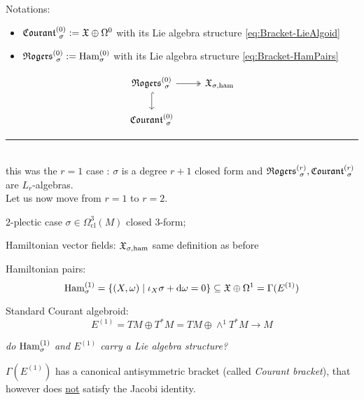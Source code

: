 \documentclass[beamer,10pt]{standalone}
\newcommand{\seprule}{\par\noindent\rule{.4\textwidth}{0.4pt}\\
}
\begin{document}
\begin{frame}
	\begin{block}{Notations:}
		\begin{itemize}
			\item $\Courant[\sigma]{0} := \X\oplus \Omega^{0}$ with its Lie algebra structure \eqref{eq:Bracket-LieAlgoid}
			\item $\Rogers[\sigma]{0} := \Ham^{(0)}_\sigma$ with its Lie algebra structure \eqref{eq:Bracket-HamPairs}
		\end{itemize}
	\end{block}
	\vfill

	\begin{displaymath}
		\begin{tikzcd}[ampersand replacement=\&]
			\Rogers[\sigma]{0}   \ar[r,two heads]\ar[d,hook]\& \X_{\sigma,\ham}
			\\ 
			\Courant[\sigma]{0}
		\end{tikzcd}
	\end{displaymath}
	\vfill

	\seprule
	this was the $r=1$ case : $\sigma$ is a degree $r+1$ closed form and $\Rogers[\sigma]{r},\Courant[\sigma]{r}$ are $L_r$-algebras.
	\\
	Let us now move from $r=1$ to $r=2$.

\end{frame}

\begin{frame}{2-plectic case}
	$\sigma \in \Omega^3_{\mathrm{cl}}(M)$ closed 3-form;
	\vfill

	Hamiltonian vector fields: $\X_{\sigma,\ham}$ same definition as before
	\vfill

	Hamiltonian pairs:
	$$
		\Ham^{(1)}_\sigma = \{ (X,\omega) \mid \iota_X \sigma + \d \omega  = 0 \}\subseteq \X\oplus \Omega^1 = \Gamma(E^{(1)})
	$$
	\vfill
	
	Standard Courant algebroid:
	$$ E^{(1)} = TM \oplus T^*M = TM \oplus \wedge^1 T^* M \to M$$
	\vfill

	\emph{do $\Ham^{(1)}_\sigma$ and $E^{(1)}$ carry a Lie algebra structure?}
	\vfill

	$\Gamma(E^{(1)})$ has a canonical antisymmetric bracket (called \emph{Courant bracket}), that however does \underline{not} satisfy the Jacobi identity.
\end{frame}
\end{document}
